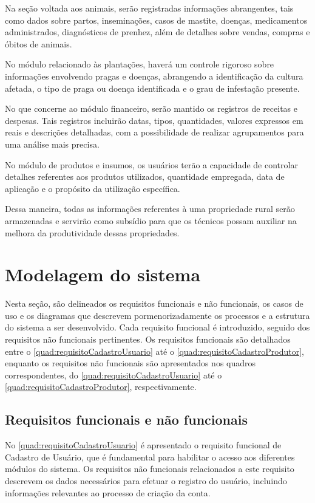 Na seção voltada aos animais, serão registradas informações abrangentes, tais como dados sobre partos, inseminações, casos de mastite, doenças, medicamentos administrados, diagnósticos de prenhez, além de detalhes sobre vendas, compras e óbitos de animais.

No módulo relacionado às plantações, haverá um controle rigoroso sobre informações envolvendo pragas e doenças, abrangendo a identificação da cultura afetada, o tipo de praga ou doença identificada e o grau de infestação presente.

No que concerne ao módulo financeiro, serão mantido os registros de receitas e despesas. Tais registros incluirão datas, tipos, quantidades, valores expressos em reais e descrições detalhadas, com a possibilidade de realizar agrupamentos para uma análise mais precisa.

No módulo de produtos e insumos, os usuários terão a capacidade de controlar detalhes referentes aos produtos utilizados, quantidade empregada, data de aplicação e o propósito da utilização específica.

Dessa maneira, todas as informações referentes à uma propriedade rural serão armazenadas e servirão como subsídio para que os técnicos possam auxiliar na melhora da produtividade dessas propriedades.


\section{Modelagem do sistema}\label{sec:modelagemSistema}

Nesta seção, são delineados os requisitos funcionais e não funcionais, os casos de uso e os diagramas que descrevem pormenorizadamente os processos e a estrutura do sistema a ser desenvolvido. Cada requisito funcional é introduzido, seguido dos requisitos não funcionais pertinentes.
Os requisitos funcionais são detalhados entre o \autoref{quad:requisitoCadastroUsuario} até o \autoref{quad:requisitoCadastroProdutor}, enquanto os requisitos não funcionais são apresentados nos quadros correspondentes, do \autoref{quad:requisitoCadastroUsuario} até o \autoref{quad:requisitoCadastroProdutor}, respectivamente.

\subsection{Requisitos funcionais e não funcionais}\label{subsec:requisitosFuncionaisNaoFuncionais}

No \autoref{quad:requisitoCadastroUsuario} é apresentado o requisito funcional de Cadastro de Usuário, que é fundamental para habilitar o acesso aos diferentes módulos do sistema. Os requisitos não funcionais relacionados a este requisito descrevem os dados necessários para efetuar o registro do usuário, incluindo informações relevantes ao processo de criação da conta.


